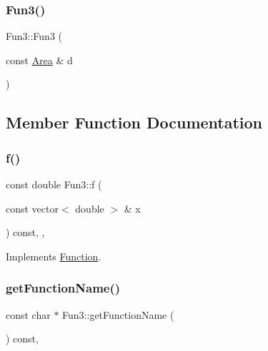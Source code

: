 \mbox{\label{class_fun3_a2c433a4d650aec03b2d42bb86d6ca969}} 
\subsubsection{\texorpdfstring{Fun3()}{Fun3()}\hspace{0.1cm}{\footnotesize\ttfamily [2/2]}}
{\footnotesize\ttfamily Fun3\+::\+Fun3 (\begin{DoxyParamCaption}\item[{const \hyperlink{class_area}{Area} \&}]{d }\end{DoxyParamCaption})}



\subsection{Member Function Documentation}
\mbox{\label{class_fun3_ad0ed4dd48ce5107560db42959f57f1f5}} 
\subsubsection{\texorpdfstring{f()}{f()}}
{\footnotesize\ttfamily const double Fun3\+::f (\begin{DoxyParamCaption}\item[{const vector$<$ double $>$ \&}]{x }\end{DoxyParamCaption}) const\hspace{0.3cm}{\ttfamily [inline]}, {\ttfamily [override]}, {\ttfamily [virtual]}}



Implements \hyperlink{class_function_a81ec299f137e34109246cde88d88c949}{Function}.

\mbox{\label{class_fun3_a512d64bca04226bb354d8a7505794277}} 
\subsubsection{\texorpdfstring{get\+Function\+Name()}{getFunctionName()}}
{\footnotesize\ttfamily const char $\ast$ Fun3\+::get\+Function\+Name (\begin{DoxyParamCaption}{ }\end{DoxyParamCaption}) const\hspace{0.3cm}{\ttfamily [override]}, {\ttfamily [virtual]}}



